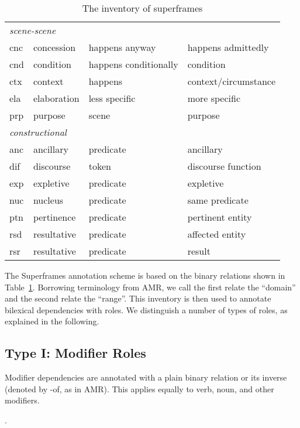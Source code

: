 \documentclass[a4paper]{article}
\begin{document}
\begin{table}
\begin{tabular}{llll}
        \multicolumn{4}{l}{\emph{scene-scene}} \\
        cnc & concession & happens anyway & happens admittedly \\
        cnd & condition & happens conditionally & condition \\
        ctx & context & happens & context/circumstance \\
        ela & elaboration & less specific & more specific \\
        prp & purpose & scene & purpose \\
        \midrule
        \multicolumn{4}{l}{\emph{constructional}} \\
        anc & ancillary & predicate & ancillary \\
        dif & discourse & token & discourse function \\
        exp & expletive & predicate & expletive \\
        nuc & nucleus & predicate & same predicate \\
        ptn & pertinence & predicate & pertinent entity \\
        rsd & resultative & predicate & affected entity \\
        rsr & resultative & predicate & result \\ 
        \bottomrule
    \end{tabular}
    \caption{The inventory of superframes}
    \label{tab:inventory}
\end{table}

The Superframes annotation scheme is based on the binary relations shown in Table~\ref{tab:inventory}. Borrowing terminology from AMR, we call the first relate the ``domain'' and the second relate the ``range''. This inventory is then used to annotate bilexical dependencies with roles. We distinguish a number of types of roles, as explained in the following.

\subsection{Type I: Modifier Roles}

Modifier dependencies are annotated with a plain binary relation or its inverse (denoted by \textsf{-of}, as in AMR). This applies equally to verb, noun, and other modifiers.

\ex. 
\end{document}
